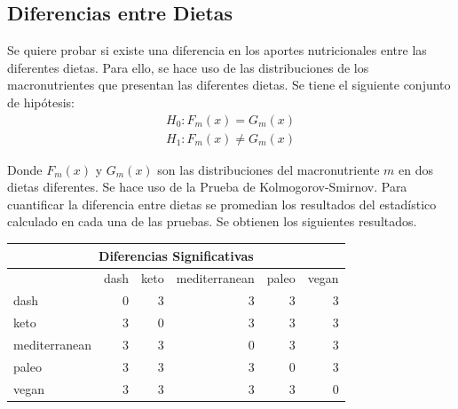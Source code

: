\documentclass[12pt,a4paper]{article}
\begin{document}
{        \subsection{Diferencias entre Dietas}
        {
            Se quiere probar si
            existe una diferencia en los aportes nutricionales entre las diferentes 
            dietas. Para ello, se hace uso de las distribuciones de los macronutrientes 
            que presentan las diferentes dietas. Se tiene el siguiente conjunto de  
            hipótesis:
            \begin{align*}
                H_0 : F_m(x) = G_m(x) \\
                H_1 : F_m(x) \ne G_m(x)
            \end{align*}

            Donde $F_m(x)$ y $G_m(x)$ son las distribuciones del macronutriente $m$ en 
            dos dietas diferentes. Se hace uso de la Prueba de Kolmogorov-Smirnov. Para 
            cuantificar la diferencia entre dietas 
            se promedian los resultados del estadístico calculado en cada una de las pruebas.
            Se obtienen los siguientes resultados.

            \begin{center}
                \begin{tabular}{l|rrrrr}
                \toprule
                    \multicolumn{6}{c}{Diferencias Significativas} \\
                \midrule
                    & dash & keto & mediterranean & paleo & vegan \\
                \midrule
                    dash & 0 & 3 & 3 & 3 & 3 \\
                    keto & 3 & 0 & 3 & 3 & 3 \\
                    mediterranean & 3 & 3 & 0 & 3 & 3 \\
                    paleo & 3 & 3 & 3 & 0 & 3 \\
                    vegan & 3 & 3 & 3 & 3 & 0 \\
                \bottomrule
                \end{tabular}
            \end{center}
            
}}
\end{document}
